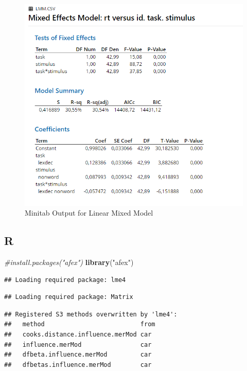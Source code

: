 \documentclass[
]{book}
\newenvironment{Shaded}{\begin{snugshade}}{\end{snugshade}}
\newcommand{\CommentTok}[1]{\textcolor[rgb]{0.56,0.35,0.01}{\textit{#1}}}
\newcommand{\KeywordTok}[1]{\textcolor[rgb]{0.13,0.29,0.53}{\textbf{#1}}}
\newcommand{\NormalTok}[1]{#1}
\newcommand{\StringTok}[1]{\textcolor[rgb]{0.31,0.60,0.02}{#1}}
\begin{document}
\begin{figure}[!h]
\includegraphics{Screenshots/Linear Mixed Model/lmmMinitab} \caption{\label{fig:lmmMinitab}Minitab Output for Linear Mixed Model}\label{fig:lmmMinitab}
\end{figure}

\hypertarget{r}{%
\subsection{R}\label{r}}

\begin{Shaded}
\begin{Highlighting}[]
\CommentTok{#install.packages("afex")}
\KeywordTok{library}\NormalTok{(}\StringTok{"afex"}\NormalTok{)}
\end{Highlighting}
\end{Shaded}

\begin{verbatim}
## Loading required package: lme4
\end{verbatim}

\begin{verbatim}
## Loading required package: Matrix
\end{verbatim}

\begin{verbatim}
## Registered S3 methods overwritten by 'lme4':
##   method                          from
##   cooks.distance.influence.merMod car 
##   influence.merMod                car 
##   dfbeta.influence.merMod         car 
##   dfbetas.influence.merMod        car
\end{verbatim}
\end{document}
